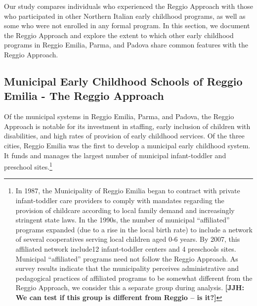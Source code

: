 Our study compares individuals who experienced the Reggio Approach with those who participated in other Northern Italian early childhood programs, as well as some who were not enrolled in any formal program. In this section, we document the Reggio Approach and explore the extent to which other early childhood programs in Reggio Emilia, Parma, and Padova share common features with the Reggio Approach.

\subsection{Municipal Early Childhood Schools of Reggio Emilia - The Reggio Approach}

Of the municipal systems in Reggio Emilia, Parma, and Padova, the Reggio Approach is notable for its investment in staffing, early inclusion of children with disabilities, and high rates of provision of early childhood services. Of the three cities, Reggio Emilia was the first to develop a municipal early childhood system. It funds and manages the largest number of municipal infant-toddler and preschool sites.\footnote{In 1987, the Municipality of Reggio Emilia began to contract with private infant-toddler care providers to comply with mandates regarding the provision of childcare according to local family demand and increasingly stringent state laws. In the 1990s, the number of municipal ``affiliated'' programs expanded (due to a rise in the local birth rate) to include a network of several cooperatives serving local children aged 0-6 years. By 2007, this affiliated network include12 infant-toddler centers and 4 preschools sites. Municipal ``affiliated'' programs need not follow the Reggio Approach. As survey results indicate that the municipality perceives administrative and pedagogical practices of affiliated programs to be somewhat different from the Reggio Approach, we consider this a separate group during analysis. \textbf{[JJH: We can test if this group is different from Reggio -- is it?]}}

